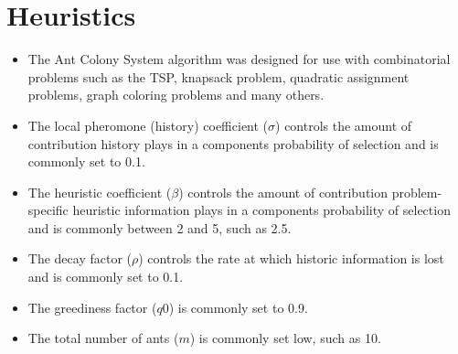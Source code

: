 \documentclass[a4paper, 11pt]{article}
\begin{document}
\section{Heuristics}
\label{sec:heuristics}
\begin{itemize}
	\item The Ant Colony System algorithm was designed for use with combinatorial problems such as the TSP, knapsack problem, quadratic assignment problems, graph coloring problems and many others.
	\item The local pheromone (history) coefficient ($\sigma$) controls the amount of contribution history plays in a components probability of selection and is commonly set to 0.1.
	\item The heuristic coefficient ($\beta$) controls the amount of contribution problem-specific heuristic information plays in a components probability of selection and is commonly between 2 and 5, such as 2.5.
	\item The decay factor ($\rho$) controls the rate at which historic information is lost and is commonly set to 0.1.
	\item The greediness factor ($q0$) is commonly set to 0.9.
	\item The total number of ants ($m$) is commonly set low, such as 10.
\end{itemize}

\end{document}
